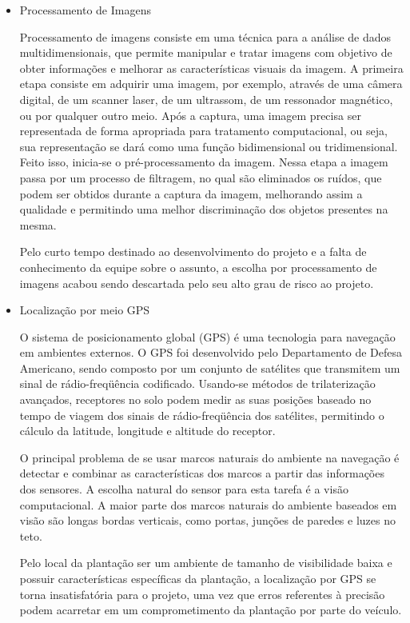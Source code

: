  \begin{itemize}

 \item Processamento de Imagens

  Processamento de imagens consiste em uma técnica para a análise de dados
  multidimensionais, que permite manipular e tratar imagens com objetivo de
  obter informações e melhorar as características visuais da imagem.
  A primeira etapa consiste em adquirir uma imagem, por exemplo,
  através de uma câmera digital, de um scanner laser, de um ultrassom,
  de um ressonador magnético, ou por qualquer outro meio. Após a captura,
  uma imagem precisa ser representada de forma apropriada para tratamento
  computacional, ou seja, sua representação se dará como uma função
  bidimensional ou tridimensional. Feito isso, inicia-se o pré-processamento
  da imagem. Nessa etapa a imagem passa por um processo de filtragem,
  no qual são eliminados os ruídos, que podem ser obtidos durante a
  captura da imagem, melhorando assim a qualidade e permitindo uma melhor
  discriminação dos objetos presentes na mesma.

  Pelo curto tempo destinado ao desenvolvimento do projeto e a falta de
  conhecimento da equipe sobre o assunto, a escolha por processamento de
  imagens acabou sendo descartada pelo seu alto grau de risco ao projeto.

 \item Localização por meio GPS

  O sistema de posicionamento global (GPS) é uma tecnologia
  para navegação em ambientes externos. O GPS foi desenvolvido
  pelo Departamento de Defesa Americano, sendo composto por um conjunto
  de satélites que transmitem um sinal de rádio-freqüência codificado.
  Usando-se métodos de trilaterização avançados, receptores no solo podem
  medir as suas posições baseado no tempo de viagem dos sinais de
  rádio-freqüência dos satélites, permitindo o cálculo da latitude,
  longitude e altitude do receptor.

  O principal problema de se usar marcos naturais do ambiente na
  navegação é detectar e combinar as características dos marcos
  a partir das informações dos sensores. A escolha natural do sensor
  para esta tarefa é a visão computacional. A maior parte dos marcos
  naturais do ambiente baseados em visão são longas bordas verticais,
  como portas, junções de paredes e luzes no teto.

  Pelo local da plantação ser um ambiente de tamanho de visibilidade
  baixa e possuir características específicas da plantação, a localização
  por GPS se torna insatisfatória para o projeto, uma vez que erros
  referentes à precisão podem acarretar em um comprometimento da plantação
  por parte do veículo.



\end{itemize}
